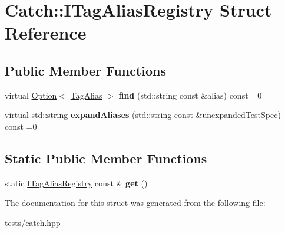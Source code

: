 \hypertarget{struct_catch_1_1_i_tag_alias_registry}{}\section{Catch\+:\+:I\+Tag\+Alias\+Registry Struct Reference}
\label{struct_catch_1_1_i_tag_alias_registry}
\subsection*{Public Member Functions}
\begin{DoxyCompactItemize}
\item 
\mbox{\label{struct_catch_1_1_i_tag_alias_registry_a7d2fba4d39cfcc62c2695fcde4f989c3}} 
virtual \hyperlink{class_catch_1_1_option}{Option}$<$ \hyperlink{struct_catch_1_1_tag_alias}{Tag\+Alias} $>$ {\bfseries find} (std\+::string const \&alias) const =0
\item 
\mbox{\label{struct_catch_1_1_i_tag_alias_registry_ae729a7532faf7466db1a157ce0395170}} 
virtual std\+::string {\bfseries expand\+Aliases} (std\+::string const \&unexpanded\+Test\+Spec) const =0
\end{DoxyCompactItemize}
\subsection*{Static Public Member Functions}
\begin{DoxyCompactItemize}
\item 
\mbox{\label{struct_catch_1_1_i_tag_alias_registry_aa9d0f008f49473389c7abf6071f137a7}} 
static \hyperlink{struct_catch_1_1_i_tag_alias_registry}{I\+Tag\+Alias\+Registry} const  \& {\bfseries get} ()
\end{DoxyCompactItemize}


The documentation for this struct was generated from the following file\+:\begin{DoxyCompactItemize}
\item 
tests/catch.\+hpp\end{DoxyCompactItemize}
